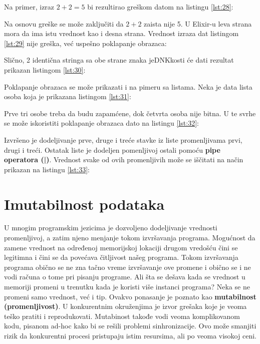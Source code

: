 \documentclass[12pt,oneside]{memoir}
\begin{document}
Na primer, izraz $2 + 2 = 5$ bi rezultirao greškom datom na listingu \ref{lst:28}:



Na osnovu greške se može zaključiti da $2 + 2$ zaista nije 5. U Elixir-u leva strana mora da ima istu vrednost kao i desna strana. Vrednost izraza dat listingom \ref{lst:29} nije greška, već uspešno poklapanje obrazaca:



Slično, 2 identična stringa sa obe strane znaka jeDNKkosti će dati rezultat prikazan listingom \ref{lst:30}:



Poklapanje obrazaca se može prikazati i na pimeru sa listama. Neka je data lista osoba koja je prikazana listingom \ref{lst:31}:



Prve tri osobe treba da budu zapamćene, dok četvrta osoba nije bitna. U te svrhe se može iskoristiti poklapanje obrazaca dato na listingu \ref{lst:32}:



Izvršeno je dodeljivanje prve, druge i treće stavke iz liste promenljivama prvi, drugi i treći. Ostatak liste je dodeljen pomenljivoj ostali pomoću \textbf{pipe operatora (|)}. Vrednost svake od ovih promenljivih može se iščitati na način prikazan na listingu \ref{lst:33}:



\newpage

\section{Imutabilnost podataka}

U mnogim programskim jezicima je dozvoljeno dodeljivanje vrednosti promenljivoj, a zatim njeno menjanje tokom izvršavanja programa. Mogućnost da zamene vrednost na određenoj memorijskoj lokaciji drugom vredošću čini se legitimna i čini se da povećava čitljivost našeg programa. Tokom izvršavanja programa obično se ne zna tačno vreme izvršavanje ove promene i obično se i ne vodi računa o tome pri pisanju programe. Ali šta se dešava kada se vrednost u memoriji promeni u trenutku kada je koristi više instanci programa? Neka se ne promeni samo vrednost, već i tip. Ovakvo ponasanje je poznato kao \textbf{mutabilnost (promenljivost)}. U konkurentnim okruženjima je izvor grešaka koje je veoma teško pratiti i reprodukovati. Mutabinost takođe vodi veoma komplikovanom kodu, pisanom ad-hoc kako bi se rešili problemi sinhronizacije. Ovo može smanjiti rizik da konkurentni procesi  pristupaju istim resursima, ali po veoma visokoj ceni.
\end{document}
